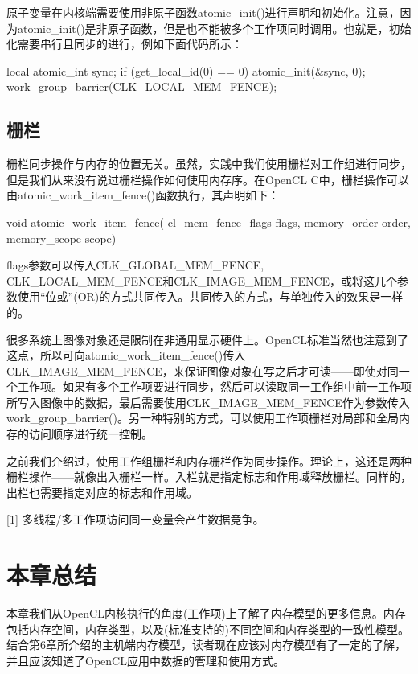 原子变量在内核端需要使用非原子函数atomic\_\allowbreak{}init()进行声明和初始化。注意，因为atomic\_\allowbreak{}init()是非原子函数，但是也不能被多个工作项同时调用。也就是，初始化需要串行且同步的进行，例如下面代码所示：

\begin{codebox}[cpp]
local atomic_int sync;
if (get_local_id(0) == 0){
  atomic_init(&sync, 0);
}
work_group_barrier(CLK_LOCAL_MEM_FENCE);
\end{codebox}

\subsection{栅栏}

栅栏同步操作与内存的位置无关。虽然，实践中我们使用栅栏对工作组进行同步，但是我们从来没有说过栅栏操作如何使用内存序。在OpenCL C中，栅栏操作可以由atomic\_\allowbreak{}work\_\allowbreak{}item\_\allowbreak{}fence()函数执行，其声明如下：

\begin{codebox}[cpp]
void
atomic_work_item_fence(
  cl_mem_fence_flags flags,
  memory_order order,
  memory_scope scope)
\end{codebox}

flags参数可以传入CLK\_\allowbreak{}GLOBAL\_\allowbreak{}MEM\_\allowbreak{}FENCE, CLK\_\allowbreak{}LOCAL\_\allowbreak{}MEM\_\allowbreak{}FENCE和CLK\_\allowbreak{}IMAGE\_\allowbreak{}MEM\_\allowbreak{}FENCE，或将这几个参数使用“位或”(OR)的方式共同传入。共同传入的方式，与单独传入的效果是一样的。

很多系统上图像对象还是限制在非通用显示硬件上。OpenCL标准当然也注意到了这点，所以可向atomic\_\allowbreak{}work\_\allowbreak{}item\_\allowbreak{}fence()传入CLK\_\allowbreak{}IMAGE\_\allowbreak{}MEM\_\allowbreak{}FENCE，来保证图像对象在写之后才可读——即使对同一个工作项。如果有多个工作项要进行同步，然后可以读取同一工作组中前一工作项所写入图像中的数据，最后需要使用CLK\_\allowbreak{}IMAGE\_\allowbreak{}MEM\_\allowbreak{}FENCE作为参数传入work\_\allowbreak{}group\_\allowbreak{}barrier()。另一种特别的方式，可以使用工作项栅栏对局部和全局内存的访问顺序进行统一控制。

之前我们介绍过，使用工作组栅栏和内存栅栏作为同步操作。理论上，这还是两种栅栏操作——就像出入栅栏一样。入栏就是指定标志和作用域释放栅栏。同样的，出栏也需要指定对应的标志和作用域。

\myRefRule

\begin{myRefs}

[1] 多线程/多工作项访问同一变量会产生数据竞争。

\end{myRefs}



\section{本章总结}

本章我们从OpenCL内核执行的角度(工作项)上了解了内存模型的更多信息。内存包括内存空间，内存类型，以及(标准支持的)不同空间和内存类型的一致性模型。结合第6章所介绍的主机端内存模型，读者现在应该对内存模型有了一定的了解，并且应该知道了OpenCL应用中数据的管理和使用方式。


